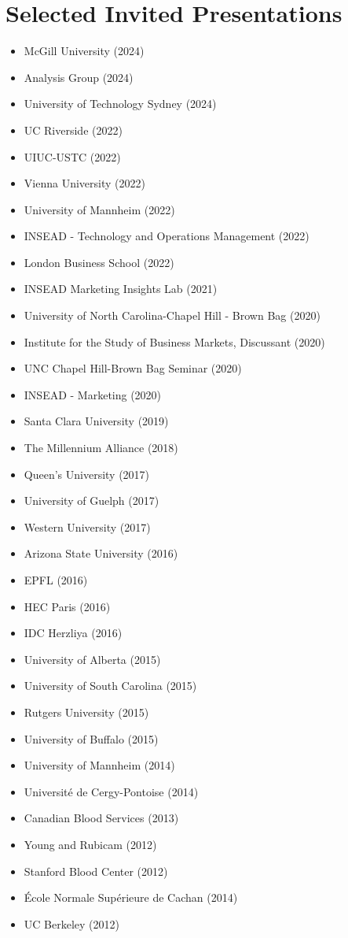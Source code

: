 \documentclass[10pt]{article}
\begin{document}
\section{Selected Invited Presentations}
\begin{itemize}
\item[] McGill University (2024)
\item[] Analysis Group (2024)
\item[] University of Technology Sydney (2024)
\item[] UC Riverside (2022)
\item[] UIUC-USTC (2022)
\item[] Vienna University (2022)
\item[] University of Mannheim (2022)
\item[] INSEAD - Technology and Operations Management (2022)
\item[] London Business School (2022)
\item[] INSEAD Marketing Insights Lab (2021)
\item[] University of North Carolina-Chapel Hill - Brown Bag (2020)
\item[] Institute for the Study of Business Markets, Discussant (2020)
\item[] UNC Chapel Hill-Brown Bag Seminar (2020) 
\item[] INSEAD - Marketing (2020)
\item[] Santa Clara University (2019)
\item[]  The Millennium Alliance (2018)
\item[] Queen's University (2017)
\item[] University of Guelph (2017)
\item[] Western University (2017)
\item[] Arizona State University (2016)
\item[]  EPFL (2016)
\item[] HEC Paris (2016)
\item[] IDC Herzliya (2016)
\item[]  University of Alberta (2015)
\item[] University of South Carolina (2015)
\item[]  Rutgers University (2015)
\item[]  University of Buffalo (2015)
\item[] University of Mannheim (2014)
\item[]  Universit\'{e} de Cergy-Pontoise (2014)
\item[] Canadian Blood Services (2013)
\item[] Young and Rubicam (2012)
\item[] Stanford Blood Center (2012)
\item[]  \'{E}cole Normale Sup\'{e}rieure de Cachan (2014)
\item[] UC Berkeley (2012)
\end{itemize}
\end{document}
